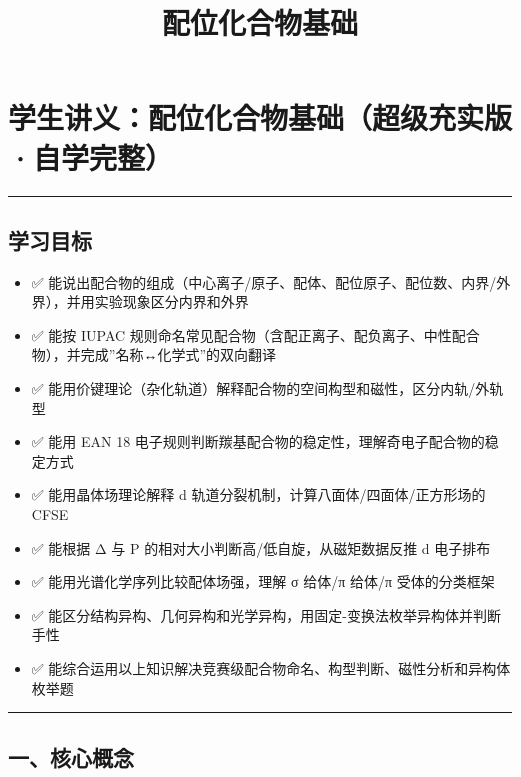 \documentclass[a4paper,11pt]{ctexart}
\title{配位化合物基础}
\date{}
\providecommand{\tightlist}{\setlength{\itemsep}{0pt}\setlength{\parskip}{0pt}}
\begin{document}
\maketitle
\tableofcontents
\newpage
\section{学生讲义：配位化合物基础（超级充实版·自学完整）}\label{ux5b66ux751fux8bb2ux4e49ux914dux4f4dux5316ux5408ux7269ux57faux7840ux8d85ux7ea7ux5145ux5b9eux7248ux81eaux5b66ux5b8cux6574}

\begin{center}\rule{0.5\linewidth}{0.5pt}\end{center}

\subsection{学习目标}\label{ux5b66ux4e60ux76eeux6807}

\begin{itemize}
\tightlist
\item
  ✅ 能说出配合物的组成（中心离子/原子、配体、配位原子、配位数、内界/外界），并用实验现象区分内界和外界
\item
  ✅ 能按 IUPAC 规则命名常见配合物（含配正离子、配负离子、中性配合物），并完成''名称↔化学式''的双向翻译
\item
  ✅ 能用价键理论（杂化轨道）解释配合物的空间构型和磁性，区分内轨/外轨型
\item
  ✅ 能用 EAN 18 电子规则判断羰基配合物的稳定性，理解奇电子配合物的稳定方式
\item
  ✅ 能用晶体场理论解释 d 轨道分裂机制，计算八面体/四面体/正方形场的 CFSE
\item
  ✅ 能根据 Δ 与 P 的相对大小判断高/低自旋，从磁矩数据反推 d 电子排布
\item
  ✅ 能用光谱化学序列比较配体场强，理解 σ 给体/π 给体/π 受体的分类框架
\item
  ✅ 能区分结构异构、几何异构和光学异构，用固定-变换法枚举异构体并判断手性
\item
  ✅ 能综合运用以上知识解决竞赛级配合物命名、构型判断、磁性分析和异构体枚举题
\end{itemize}

\begin{center}\rule{0.5\linewidth}{0.5pt}\end{center}

\subsection{一、核心概念}\label{ux4e00ux6838ux5fc3ux6982ux5ff5}
\end{document}
